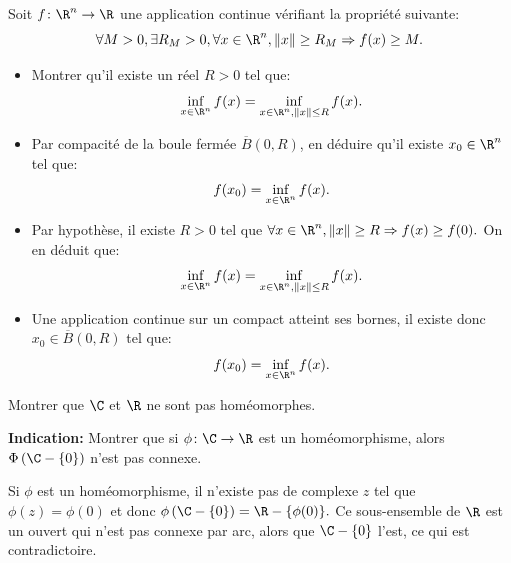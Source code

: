 \documentclass[a4paper, 12pt]{amsart}
\begin{document}
\begin{fex}
    Soit $f \colon \R^n \to \R$ une application continue vérifiant la propriété suivante:
    \[
    \forall M > 0, \exists R_M > 0, \forall x \in \R^n, \| x \| \geq R_M \Rightarrow f(x) \geq M. 
    \]
    \begin{itemize}
        \item Montrer qu'il existe un réel $R > 0$ tel que:
        \[\inf_{x\in \R^n} f(x) = \inf_{x\in \R^n, \|x\| \leq R} f(x).\]
        \item Par compacité de la boule fermée $\overline{B}(0,R)$, en déduire qu'il existe $x_0 \in \R^n$ tel que:
        \[
        f(x_0) = \inf_{x\in \R^n} f(x).
        \]
    \end{itemize}
\end{fex}
\begin{itemize}
    \item  Par hypothèse, il existe $R> 0$ tel que $\forall x \in \R^n, \| x \| \geq R \Rightarrow f(x) \geq f(0).$ On en déduit que:
    \begin{equation}
        \inf_{x\in \R^n} f(x) = \inf_{x\in \R^n, \|x\| \leq R} f(x).
    \end{equation}
    \item Une application continue sur un compact atteint ses bornes, il existe donc $x_0 \in \overline{B}(0,R)$ tel que:
    \begin{equation}
        f(x_0) = \inf_{x\in \R^n} f(x).
    \end{equation}
\end{itemize}


\begin{fex}
   Montrer que $\C$ et $\R$ ne sont pas homéomorphes. 
    
    \textbf{Indication:} Montrer que si $\phi \colon \C \to \R$ est un homéomorphisme, alors $\Phi\left(\C-\{0\}\right)$ n'est pas connexe.    
\end{fex}
Si $\phi$ est un homéomorphisme, il n'existe pas de complexe $z$ tel que $\phi(z)=\phi(0)$ et donc
$\phi\left(\C - \{0\}\right)=\R-\{\phi(0)\}.$ Ce sous-ensemble de $\R$ est un ouvert qui n'est pas
connexe par arc, alors que $\C - \{0\}$ l'est, ce qui est contradictoire.

\end{document}
